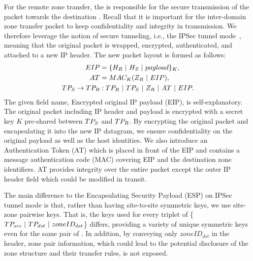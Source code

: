 For the remote zone transfer, the \tp is responsible for the secure transmission of the
packet towards the destination \tp. Recall that it is important for the inter-domain 
zone transfer packet to keep confidentiality and integrity in transmission. We therefore 
leverage the notion of secure tunneling, i.e., the IPSec tunnel mode~\cite{rfc4301,rfc4303}, 
meaning that the original packet is wrapped, encrypted, authenticated, and attached to a 
new IP header. The new packet layout is formed as follows:
\noindent 
\begin{subequations}
\begin{align}
EIP & = \{H_R~|~H_S~|~payload\}_K, \\
AT & = MAC_K(Z_R~|~EIP), \\
TP_S \rightarrow TP_R &: TP_R~|~TP_S~|~Z_R~|~AT~|~EIP.
\end{align}%
\label{eq:forwarding}%
\end{subequations}%
The given field name, Encrypted original IP payload (EIP), is self-explanatory. 
The original 
packet including IP header and payload is encrypted with a secret key $K$ pre-shared 
between $TP_S$ and $TP_R$. By encrypting the original packet and encapsulating it into
the new IP datagram, we ensure confidentiality on the original payload as well as the 
host identities. We also introduce an Authentication Token (AT) which is placed in front of 
the EIP and contains a message authentication code (MAC) covering EIP and the destination 
zone identifiers.
AT provides integrity over the entire packet except the outer IP header field which could 
be modified in transit.


The main difference to the Encapsulating Security Payload (ESP) on IPSec tunnel mode 
is that, rather than having site-to-site symmetric keys, we use site-zone pairwise keys.
That is, the keys used for every triplet of \{$TP_{src}~|~TP_{dst}~|~zoneID_{dst}$\} 
differs, providing a variety of unique symmetric keys even for the same pair of \tps. 
In addition, by conveying only $zoneID_{dst}$ in the header, zone pair information, which 
could lead to the potential disclosure of the zone structure
and their transfer rules, is not exposed. 


